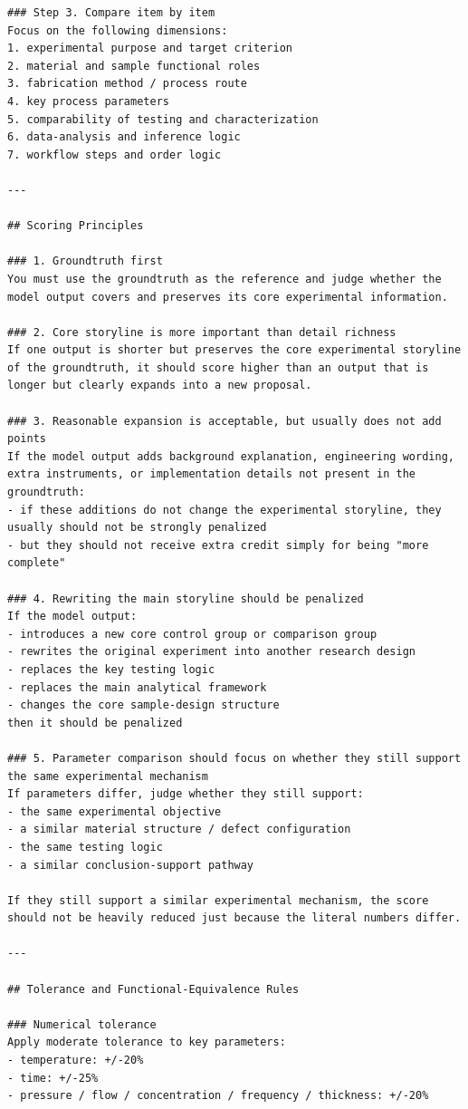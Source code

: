 \begin{lstlisting}[style=jsonstyle]
### Step 3. Compare item by item
Focus on the following dimensions:
1. experimental purpose and target criterion
2. material and sample functional roles
3. fabrication method / process route
4. key process parameters
5. comparability of testing and characterization
6. data-analysis and inference logic
7. workflow steps and order logic

---

## Scoring Principles

### 1. Groundtruth first
You must use the groundtruth as the reference and judge whether the model output covers and preserves its core experimental information.

### 2. Core storyline is more important than detail richness
If one output is shorter but preserves the core experimental storyline of the groundtruth, it should score higher than an output that is longer but clearly expands into a new proposal.

### 3. Reasonable expansion is acceptable, but usually does not add points
If the model output adds background explanation, engineering wording, extra instruments, or implementation details not present in the groundtruth:
- if these additions do not change the experimental storyline, they usually should not be strongly penalized
- but they should not receive extra credit simply for being "more complete"

### 4. Rewriting the main storyline should be penalized
If the model output:
- introduces a new core control group or comparison group
- rewrites the original experiment into another research design
- replaces the key testing logic
- replaces the main analytical framework
- changes the core sample-design structure
then it should be penalized

### 5. Parameter comparison should focus on whether they still support the same experimental mechanism
If parameters differ, judge whether they still support:
- the same experimental objective
- a similar material structure / defect configuration
- the same testing logic
- a similar conclusion-support pathway

If they still support a similar experimental mechanism, the score should not be heavily reduced just because the literal numbers differ.

---

## Tolerance and Functional-Equivalence Rules

### Numerical tolerance
Apply moderate tolerance to key parameters:
- temperature: +/-20%
- time: +/-25%
- pressure / flow / concentration / frequency / thickness: +/-20%


\end{lstlisting}
